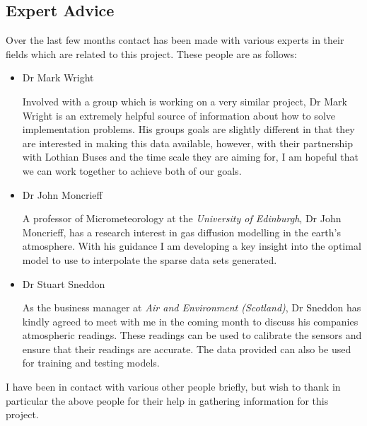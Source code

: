 \subsection{Expert Advice}\label{expertadvie}

Over the last few months contact has been made with various experts in their fields which are related to this project. These people are as follows:

\begin{itemize}

\item Dr Mark Wright

Involved with a group which is working on a very similar project, Dr Mark Wright is an extremely helpful source of information about how to solve implementation problems. His groups goals are slightly different in that they are interested in making this data available, however, with their partnership with Lothian Buses and the time scale they are aiming for, I am hopeful that we can work together to achieve both of our goals. 

\item Dr John Moncrieff 

A professor of Micrometeorology at the \emph{University of Edinburgh}, Dr John Moncrieff, has a research interest in gas diffusion modelling in the earth's atmosphere. With his guidance I am developing a key insight into the optimal model to use to interpolate the sparse data sets generated. 

\item Dr Stuart Sneddon

As the business manager at \emph{Air and Environment (Scotland)}, Dr Sneddon has kindly agreed to meet with me in the coming month to discuss his companies atmospheric readings. These readings can be used to calibrate the sensors and ensure that their readings are accurate. The data provided can also be used for training and testing models. 

\end{itemize}

I have been in contact with various other people briefly, but wish to thank in particular the above people for their help in gathering information for this project.
